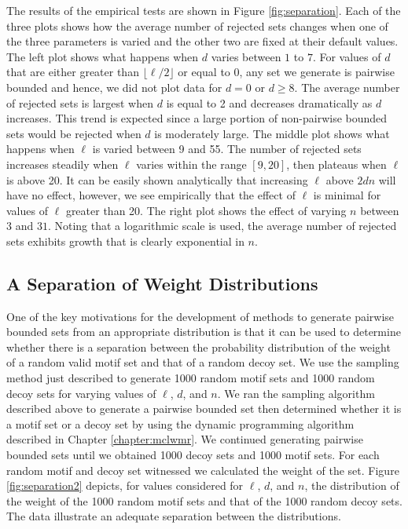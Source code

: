  The results of the empirical tests are shown in Figure \ref{fig:separation}.  Each of the three plots shows how the average number of rejected sets changes when one of the three parameters is varied and the other two are fixed at their default values.  The left plot shows what happens when $d$ varies between $1$ to $7$.  For values of $d$ that are either greater than $\lfloor \ell /2 \rfloor$ or equal to $0$, any set we generate is pairwise bounded and hence, we did not plot data for $d = 0$ or $d \geq 8$.  The average number of rejected sets is largest when $d$ is equal to 2 and decreases dramatically as $d$ increases. This trend is expected since a large portion of non-pairwise bounded sets would be rejected when $d$ is moderately large.  The middle plot shows what happens when $\ell$ is varied between 9 and 55.  The number of rejected sets increases steadily when $\ell$ varies within the range $[9, 20]$, then plateaus when $\ell$ is above 20.  It can be easily shown analytically that increasing $\ell$ above $2dn$ will have no effect, however, we see empirically that the effect of $\ell$ is minimal for values of $\ell$ greater than 20.  The right plot shows the effect of varying $n$ between $3$ and $31$.  Noting that a logarithmic scale is used, the average number of rejected sets exhibits growth that is clearly exponential in $n$.




\subsection{A Separation of Weight Distributions}

One of the key motivations for the development of methods to generate pairwise bounded sets from an appropriate distribution is that it can be used to determine whether there is a separation between the probability distribution of the weight of a random valid motif set and that of a random decoy set. We use the sampling method just described to generate 1000 random motif sets and 1000 random decoy sets for varying values of $\ell$, $d$, and $n$.  We ran the sampling algorithm described above to generate a pairwise bounded set then determined whether it is a motif set or a decoy set by using the dynamic programming algorithm described in Chapter \ref{chapter:mclwmr}.  We continued generating pairwise bounded sets until we obtained 1000 decoy sets and 1000 motif sets.  For each random motif and decoy set witnessed we calculated the weight of the set.  Figure \ref{fig:separation2} depicts, for values considered for $\ell$, $d$, and $n$, the distribution of the weight of the 1000 random motif sets and that of the 1000 random decoy sets.  The data illustrate an adequate separation between the distributions.  

